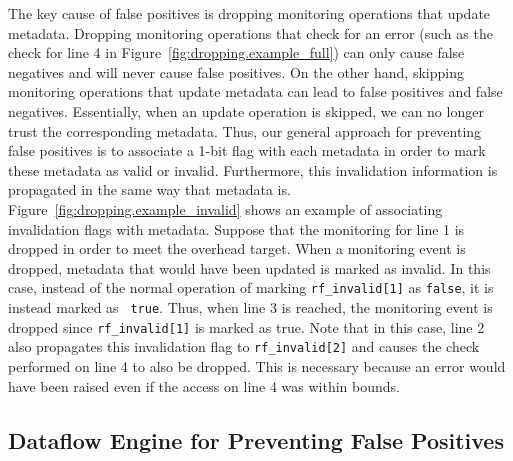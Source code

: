 The key cause of false positives is dropping monitoring operations that update
metadata. Dropping monitoring operations that check for an error (such as the check
for line 4 in Figure~\ref{fig:dropping.example_full}) can only cause
false negatives and will never cause false positives. On the other hand,
skipping monitoring operations that update metadata can lead to false positives
and false negatives.
Essentially, when an update operation is skipped, we can no longer trust the
corresponding metadata. Thus, our general approach for preventing false
positives is to associate a 1-bit flag with each metadata in order to mark these
metadata as valid or
invalid. Furthermore, this invalidation information is propagated in the same
way that metadata is. Figure~\ref{fig:dropping.example_invalid}
shows an example of associating invalidation flags with metadata. Suppose that the monitoring for
line 1 is dropped in order to meet the overhead target. When a monitoring event is dropped, metadata that would have
been updated is marked as invalid. In this case, instead of the normal
operation of marking {\tt rf\_invalid[1]} as {\tt false}, it is instead
marked as {\tt
true}. Thus, when line 3 is reached, the monitoring event is dropped
since {\tt rf\_invalid[1]} is marked as true. Note that in this case, line 2
also propagates this invalidation flag to {\tt rf\_invalid[2]} and causes the check
performed on line 4 to also be dropped. This is necessary because an error
would have been raised even if the access on line 4 was within bounds.

\subsection{Dataflow Engine for Preventing False Positives}
\label{sec:dropping.arch}

